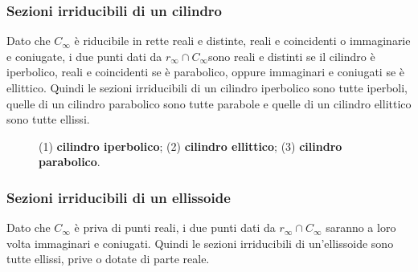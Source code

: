 \subsubsection{Sezioni irriducibili di un cilindro}
Dato che \(C_\infty\) è riducibile in rette reali e distinte, reali e coincidenti o immaginarie e coniugate, i due punti dati da \(r_\infty \cap C_\infty\)sono reali e distinti se il cilindro è iperbolico, reali e coincidenti se è parabolico, oppure immaginari e coniugati se è ellittico. Quindi le sezioni irriducibili di un cilindro iperbolico sono tutte iperboli, quelle di un cilindro parabolico sono tutte parabole e quelle di un cilindro ellittico sono tutte ellissi.
\vspace{10pt}
\begin{figure}[ht]
    \centering
    \def\svgwidth{400pt}
    \caption{(1) \textbf{cilindro iperbolico}; (2) \textbf{cilindro ellittico}; (3) \textbf{cilindro parabolico}.}
    \label{fig:sezioni-cilindro}
\end{figure}
\subsubsection{Sezioni irriducibili di un ellissoide}
Dato che \(C_\infty\) è priva di punti reali, i due punti dati da \(r_\infty \cap C_\infty\) saranno a loro volta immaginari e coniugati. Quindi le sezioni irriducibili di un'ellissoide sono tutte ellissi, prive o dotate di parte reale.
\vspace{10pt}
\begin{figure}[ht]
    \centering
    \def\svgwidth{180pt}
    \label{fig:sezione-ellissoide}
\end{figure}

